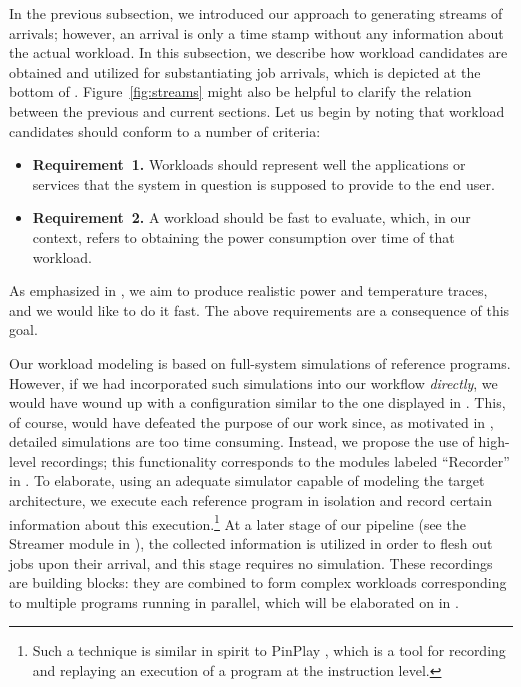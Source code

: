 
In the previous subsection, we introduced our approach to generating streams of
arrivals; however, an arrival is only a time stamp without any information about
the actual workload. In this subsection, we describe how workload candidates are
obtained and utilized for substantiating job arrivals, which is depicted at the
bottom of . Figure~\ref{fig:streams} might also be helpful to
clarify the relation between the previous and current sections. Let us begin by
noting that workload candidates should conform to a number of criteria:
\begin{itemize}
  \item {\bfseries Requirement~1.} Workloads should represent well the
  applications or services that the system in question is supposed to provide to
  the end user.

  \item {\bfseries Requirement~2.} A workload should be fast to evaluate, which,
  in our context, refers to obtaining the power consumption over time of that
  workload.
\end{itemize}
As emphasized in , we aim to produce realistic power
and temperature traces, and we would like to do it fast. The above requirements
are a consequence of this goal.

Our workload modeling is based on full-system simulations of reference programs.
However, if we had incorporated such simulations into our workflow
\emph{directly}, we would have wound up with a configuration similar to the one
displayed in . This, of course, would have defeated the
purpose of our work since, as motivated in , detailed
simulations are too time consuming. Instead, we propose the use of high-level
recordings; this functionality corresponds to the modules labeled ``Recorder''
in . To elaborate, using an adequate simulator capable of
modeling the target architecture, we execute each reference program in isolation
and record certain information about this execution.\footnote{Such a technique
is similar in spirit to PinPlay \cite{patil2010}, which is a tool for recording
and replaying an execution of a program at the instruction level.} At a later
stage of our pipeline (see the Streamer module in ), the
collected information is utilized in order to flesh out jobs upon their arrival,
and this stage requires no simulation. These recordings are building blocks:
they are combined to form complex workloads corresponding to multiple programs
running in parallel, which will be elaborated on in .

